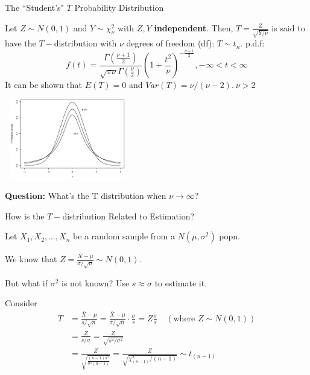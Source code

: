 \documentclass{beamer}\usepackage[]{graphicx}\usepackage[]{color}
\begin{document}
\begin{frame}{The ``Student's" $T$ Probability Distribution}

Let $Z\sim N(0,1)$ and $Y\sim\chi^2_\nu$ with $Z,Y$ {\bf independent}.
Then, $T=\frac{Z}{\sqrt{Y/\nu}}$
is said to have the $T-$distribution with $\nu$ degrees of freedom (df):
$T\sim t_n.$ \pause
\medskip
p.d.f:
$$f(t) = \frac{\Gamma(\frac{\nu+1}{2})}{\sqrt{\pi \nu} \Gamma(\frac{\nu}{2})} (1+\frac{t^2}{\nu})^{-\frac{\nu+1}{2}}, -\infty < t < \infty$$ \pause
It can be shown that $E(T) = 0$ and $Var(T) = \nu/(\nu-2).\ \nu>2$ \pause

\begin{center}
\vskip-0.6cm
\includegraphics[width=5.5cm,height=3.5cm]{6tdistns}
\vskip-1cm
\end{center}
\vskip -0.6cm
\pause
{\bf Question:} What's the T distribution when $\nu \to \infty$?
\end{frame}

\begin{frame}{How is the $T-$distribution Related to Estimation?}

Let $X_1,X_2,\ldots,X_n$ be a random sample 
from a $N(\mu,\sigma^2)$ popn.
\medskip

We know that $\displaystyle Z=\frac{\bar{X}-\mu}{\sigma/\sqrt{n}}\sim N(0,1).$ \pause
\medskip

But what if $\sigma^2$ is not known? \pause
Use $s\approx\sigma$ to estimate it.
\bigskip

Consider
\begin{align*}
T &= \frac{\bar{X}-\mu}{s/\sqrt{n}} 
= \frac{\bar{X}-\mu}{\sigma/\sqrt{n}} \cdot \frac{\sigma}{s}
= Z \frac{\sigma}{s} \quad
 (\mbox{where\ } Z\sim N(0,1) )\\
&= \frac{Z}{s/\sigma} = \frac{Z}{\sqrt{s^2/\sigma^2}}\\
&= \frac{Z}{\sqrt{\frac{(n-1)s^2}{\sigma^2(n-1)}}}
 = \frac{Z}{\sqrt{\chi^2_{(n-1)}/(n-1)}}
\sim t_{(n-1)}
\end{align*}
\pause

\end{frame}
\end{document}
